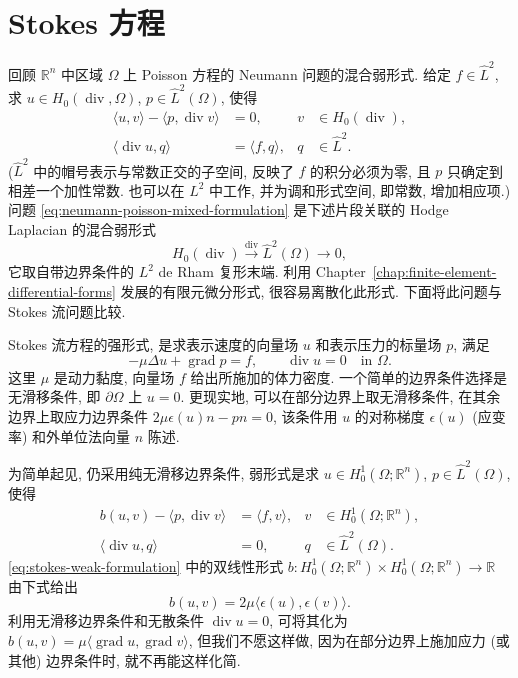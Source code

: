 \section{Stokes 方程}\label{sec:stokes-equations}

回顾 $\mathbb R^n$ 中区域 $\Omega$ 上 Poisson 方程的 Neumann 问题的混合弱形式. 给定 $f\in\hat L^2$, 求 $u\in H_{0}(\operatorname{div},\Omega)$, $p\in\hat L^2(\Omega)$, 使得
\begin{equation}\label{eq:neumann-poisson-mixed-formulation}
\begin{aligned}\langle u,v\rangle-\langle p,\operatorname{div}v\rangle&=0,&v&\in H_{0}(\operatorname{div}),\\\langle\operatorname{div}u,q\rangle&=\langle f,q\rangle,&q&\in\hat L^2.\end{aligned}
\end{equation}
($\hat L^2$ 中的帽号表示与常数正交的子空间, 反映了 $f$ 的积分必须为零, 且 $p$ 只确定到相差一个加性常数. 也可以在 $L^2$ 中工作, 并为调和形式空间, 即常数, 增加相应项.) 问题 \eqref{eq:neumann-poisson-mixed-formulation} 是下述片段关联的 Hodge Laplacian 的混合弱形式
\begin{equation}\label{eq:neumann-divergence-complex}
 H_{0}(\operatorname{div})\xrightarrow{\operatorname{div}}\hat L^2(\Omega)\to0,
\end{equation}
它取自带边界条件的 $L^2$ de Rham 复形末端. 利用 Chapter~\ref{chap:finite-element-differential-forms} 发展的有限元微分形式, 很容易离散化此形式. 下面将此问题与 Stokes 流问题比较.

Stokes 流方程的强形式, 是求表示速度的向量场 $u$ 和表示压力的标量场 $p$, 满足
\[
-\mu\Delta u+\operatorname{grad}p=f,\qquad\operatorname{div}u=0\quad\text{in }\Omega.
\]
这里 $\mu$ 是动力黏度, 向量场 $f$ 给出所施加的体力密度. 一个简单的边界条件选择是无滑移条件, 即 $\partial\Omega$ 上 $u=0$. 更现实地, 可以在部分边界上取无滑移条件, 在其余边界上取应力边界条件 $2\mu\epsilon(u)n-pn=0$, 该条件用 $u$ 的对称梯度 $\epsilon(u)$ (应变率) 和外单位法向量 $n$ 陈述.

为简单起见, 仍采用纯无滑移边界条件, 弱形式是求 $u\in H_{0}^1(\Omega;\mathbb R^n)$, $p\in\hat L^2(\Omega)$, 使得
\begin{equation}\label{eq:stokes-weak-formulation}
\begin{aligned}b(u,v)-\langle p,\operatorname{div}v\rangle&=\langle f,v\rangle,&v&\in H_{0}^1(\Omega;\mathbb R^n),\\\langle\operatorname{div}u,q\rangle&=0,&q&\in\hat L^2(\Omega).\end{aligned}
\end{equation}
\eqref{eq:stokes-weak-formulation} 中的双线性形式 $b: H_{0}^1(\Omega;\mathbb R^n)\times H_{0}^1(\Omega;\mathbb R^n)\to\mathbb R$ 由下式给出
\begin{equation}\label{eq:stokes-strain-bilinear-form}
b(u,v)=2\mu\langle\epsilon(u),\epsilon(v)\rangle.
\end{equation}
利用无滑移边界条件和无散条件 $\operatorname{div}u=0$, 可将其化为 $b(u,v)=\mu\langle\operatorname{grad}u,\operatorname{grad}v\rangle$, 但我们不愿这样做, 因为在部分边界上施加应力 (或其他) 边界条件时, 就不再能这样化简.

